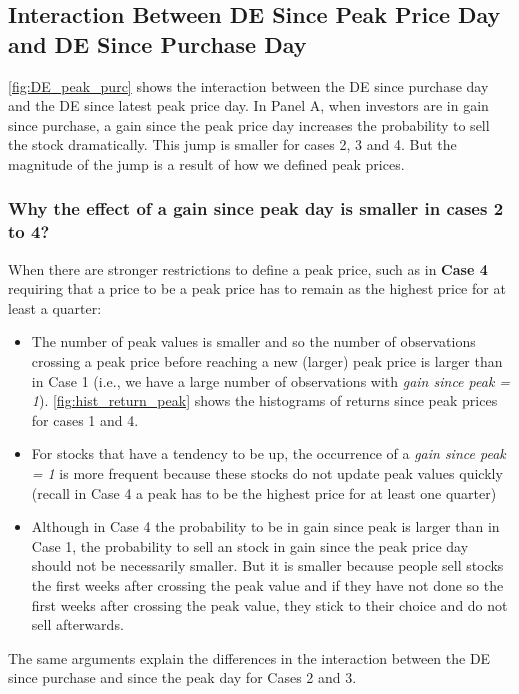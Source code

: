 \subsection{Interaction Between DE Since Peak Price Day and DE Since Purchase Day}
\ref{fig:DE_peak_purc} shows the interaction between the DE since purchase day and the DE since latest peak price day. In Panel A, when investors are in gain since purchase, a gain since the peak price day increases the probability to sell the stock dramatically. This jump is smaller for cases 2, 3 and 4. But the magnitude of the jump is a result of how we defined peak prices.


\subsubsection{Why the effect of a gain since peak day is smaller in cases 2 to 4?}

When there are stronger restrictions to define a peak price, such as in  \textbf{Case 4} requiring that a price to be a peak price has to remain as the highest price for at least a quarter:

\begin{itemize}
	\item The number of peak values is smaller and so the number of observations crossing a peak price before reaching a new (larger) peak price is larger than in Case 1 (i.e., we have a large number of observations with  \textit{gain since peak = 1}). \ref{fig:hist_return_peak} shows the histograms of returns since peak prices for cases 1 and 4.
	
	\item For stocks that have a tendency to be up, the occurrence  of a \textit{gain since peak = 1} is more frequent because these stocks do not update peak values quickly (recall  in Case 4 a peak has to be the highest price for at least one quarter)
	\item  Although in Case 4 the probability to be in gain since peak is larger than in Case 1, the probability to sell an stock in gain since the peak price day should not be necessarily smaller. But it is smaller because people sell stocks the first weeks after crossing the peak value and if they have not done so the first weeks after crossing the peak value, they stick to their choice and do not sell afterwards.	
	
\end{itemize}

The same arguments explain the differences in the interaction between the DE since purchase and since the peak day for Cases 2 and 3.

